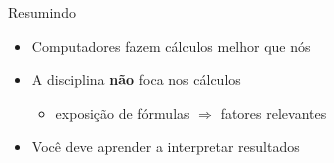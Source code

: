 \documentclass{beamer}
\begin{document}
\begin{frame}{\scriptsize Resumindo}
  \begin{itemize}
    \footnotesize
  \item Computadores fazem cálculos melhor que nós
  \item A disciplina {\bf não} foca nos cálculos
    \begin{itemize}
    \item exposição de fórmulas $\Rightarrow$ fatores relevantes
    \end{itemize}
  \item Você deve aprender a interpretar resultados
  \end{itemize}
\end{frame}




\end{document}

